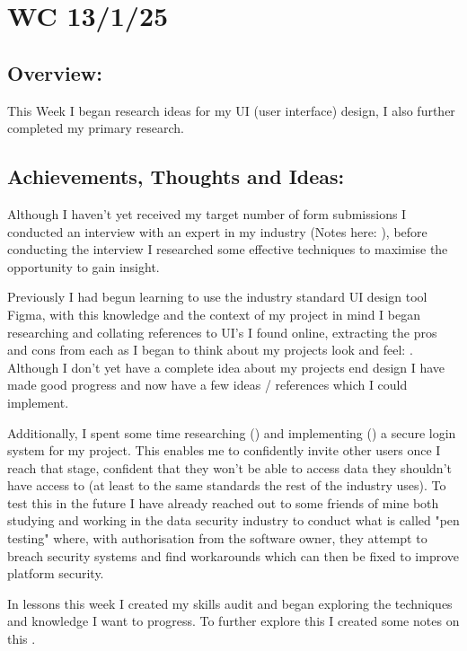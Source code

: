 \section{WC 13/1/25}

\subsection*{Overview:}
This Week I began research ideas for my UI (user interface) design, I also further completed my primary research.

\subsection*{Achievements, Thoughts and Ideas:}
Although I haven't yet received my target number of form submissions I conducted an interview with an expert in my industry (Notes here: ), before conducting the interview I researched some effective techniques to maximise the opportunity to gain insight. 

Previously I had begun learning to use the industry standard UI design tool Figma, with this knowledge and the context of my project in mind I began researching and collating references to UI's I found online, extracting the pros and cons from each as I began to think about my projects look and feel: . Although I don't yet have a complete idea about my projects end design I have made good progress and now have a few ideas / references which I could implement.

Additionally, I spent some time researching () and implementing () a secure login system for my project. This enables me to confidently invite other users once I reach that stage, confident that they won't be able to access data they shouldn't have access to (at least to the same standards the rest of the industry uses). To test this in the future I have already reached out to some friends of mine both studying and working in the data security industry to conduct what is called "pen testing" where, with authorisation from the software owner, they attempt to breach security systems and find workarounds which can then be fixed to improve platform security.

In lessons this week I created my skills audit and began exploring the techniques and knowledge I want to progress. To further explore this I created some notes on this .



